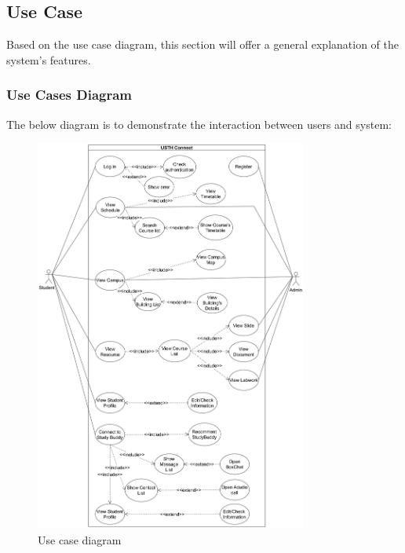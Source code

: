 \documentclass[12pt]{article}
\begin{document}
\pagebreak

\subsection{Use Case}
Based on the use case diagram, this section will offer a general explanation of the system's
features.

\subsubsection{Use Cases Diagram}
    The below diagram is to demonstrate the interaction between users and system:
    \begin{figure}[H]
        \centering
       \includegraphics[width=0.8\textwidth]{image/USTHConnect_usecase_diagram.pdf} 
        \caption{Use case diagram}
        \label{fig:usthconnect_use_case}
    \end{figure}

    \pagebreak
\end{document}
